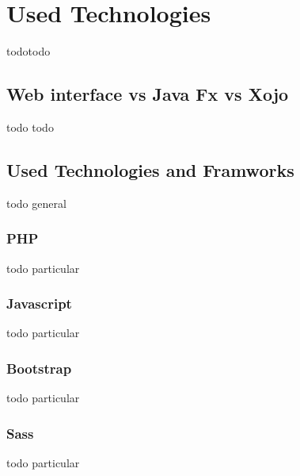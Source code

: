 
\chapter{Used Technologies} %

\label{Chapter 4} %


todotodo 


\section{Web interface vs Java Fx vs Xojo}
todo todo

\section{Used Technologies and Framworks}
todo general

\subsection{PHP}
todo particular

\subsection{Javascript}
todo particular

\subsection{Bootstrap}
todo particular

\subsection{Sass}
todo particular